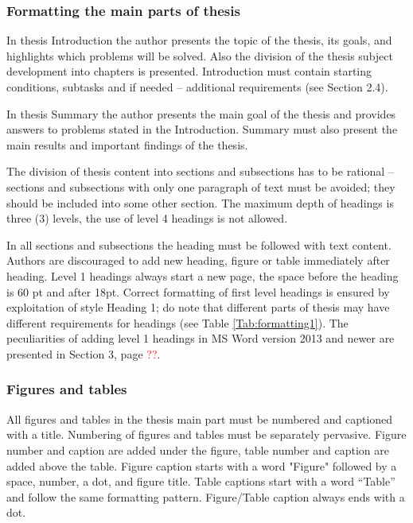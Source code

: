\subsubsection{Formatting the main parts of thesis}

In thesis Introduction the author presents the topic of the thesis, its goals, and highlights which problems will be solved. Also the division of the thesis subject development into chapters is presented. Introduction must contain starting conditions, subtasks and if needed -- additional requirements (see Section 2.4).

In thesis Summary the author presents the main goal of the thesis and provides answers to problems stated in the Introduction. Summary must also present the main results and important findings of the thesis.

The division of thesis content into sections and subsections has to be rational – sections
and subsections with only one paragraph of text must be avoided; they should be included
into some other section. The maximum depth of headings is three (3) levels, the use of
level 4 headings is not allowed.

In all sections and subsections the heading must be followed with text content. Authors are discouraged to add new heading, figure or table immediately after heading. Level 1
headings always start a new page, the space before the heading is 60 pt and after 18pt. Correct formatting of first level headings is ensured by exploitation of style Heading 1;
do note that different parts of thesis may have different requirements for headings (see Table \ref{Tab:formatting1}). The peculiarities of adding level 1 headings in MS Word version 2013 and newer are presented in Section 3, page \textcolor{red}{??}.


\subsubsection{Figures and tables}
All figures and tables in the thesis main part must be numbered and captioned with a title.
Numbering of figures and tables must be separately pervasive. Figure number and caption are added under the figure, table number and caption are added above the table. Figure
caption starts with a word "Figure" followed by a space, number, a dot, and figure title.
Table captions start with a word “Table” and follow the same formatting pattern. Figure/Table caption always ends with a dot.



